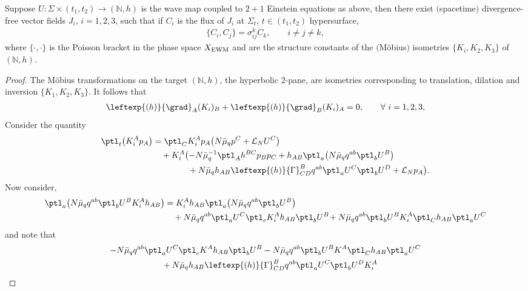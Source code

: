 \begin{Corollary}
Suppose $U\colon \Sigma \times (t_1, t_2) \to (\mathbb{N}, h)$ is the wave map coupled to $2 + 1$ Einstein equations as above,
then there exist $($spacetime$)$ divergence-free vector fields $J_i$, $i =1, 2, 3$, such that if $C_i$ is the flux of $J_i$ at $\Sigma_t$, $t \in (t_1, t_2)$ hypersurface,
\begin{align*}
\{C_i, C_j \} = \sigma^{k}_{ij} C_k, \qquad i\neq j \neq k,
\end{align*}
where $\{ \cdot, \cdot \}$ is the Poisson bracket in the phase space $X_{{\rm EWM}}$ and  are the structure constants of the $($M\"obius$)$ isometries $\{ K_i, K_2, K_3\}$ of $(\mathbb{N}, h)$.
\end{Corollary}
\begin{proof}
The M\"obius transformations on the target $(\mathbb{N}, h)$, the hyperbolic 2-pane, are isometries corresponding to translation, dilation and inversion $\{ K_1, K_2, K_3 \}$. It follows that
\begin{align*}
\leftexp{(h)}{\grad}_A (K_i)_B + \leftexp{(h)}{\grad}_B (K_i)_A =0, \qquad \forall \ i = 1, 2, 3,
\end{align*}
Consider the quantity
\begin{align*}
\ptl_t \bigl(K^A_i p_A\bigr) &{}= \ptl_C K_i^A p_A \bigl(N \bar{\mu}_q p^C + \mathcal{L}_N U^C\bigr) \notag\\
&\quad{}+ K_i^A \bigl(-N \bar{\mu}^{-1}_q \ptl_A h^{BC} p_B p_C
+ h_{AB} \ptl_a \bigl(N \bar{\mu}_q q^{ab} \ptl_b U^B\bigr) \notag\\
&\quad\hphantom{+ K_i^A \bigl(\ }{}+ N \bar{\mu}_q h_{AB} \leftexp{(h)}{\Gamma}^B_{CD} q^{ab} \ptl_a U^C \ptl_b U^D + \mathcal{L}_N p_A \bigr).
\end{align*}
Now consider,
\begin{align*}
\ptl_a \bigl(N \bar{\mu}_q q^{ab} \ptl_b U^B K_i^A h_{AB}\bigr) &{}= K_i^A h_{AB} \ptl_a \bigl(N \bar{\mu}_q q^{ab} \ptl_b U^B\bigr) \notag\\
&\quad{}+ N \bar{\mu}_q q ^{ab} \ptl_a U^C \ptl_c K_i^A h_{AB} \ptl_b U^B\!
+ N \bar{\mu}_q q^{ab} \ptl_b U^B K_i^A \ptl_C h_{AB} \ptl_a U^C
\end{align*}
and note that
\begin{gather*}
 -N \bar{\mu}_q q ^{ab} \ptl_a U^C \ptl_c K^A h_{AB} \ptl_b U^B - N \bar{\mu}_q q^{ab} \ptl_b U^B K^A \ptl_C h_{AB} \ptl_a U^C \\
\quad{} + N \bar{\mu}_q h_{AB} \leftexp{(h)}{\Gamma}^B_{CD} q^{ab} \ptl_a U^C \ptl_b U^D K_i^A \\

\end{gather*}
\end{proof}
